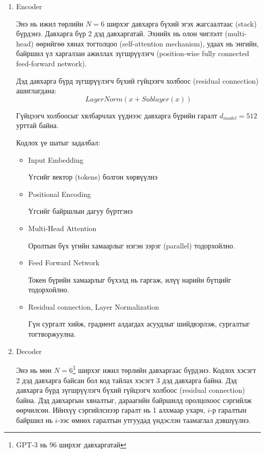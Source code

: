 \documentclass[11pt,a4paper]{article}
\begin{document}
\begin{enumerate}
\item Encoder
\label{sec:orgc57bc0b}

Энэ нь ижил төрлийн \(N=6\) ширхэг давхарга бүхий эгэх жагсаалтаас (stack) бүрдэнэ. Давхарга бүр 2 дэд давхаргатай. Эхнийх нь олон чиглэлт (multi-head) өөрийгөө хянах тогтолцоо (self-attention mechanism), удаах нь энгийн, байршил үл харгалзан ажиллах зүгшрүүлэгч (position-wise fully connected feed-forward network).\cite{Attention}

Дэд давхарга бүрд зүгшрүүлэгч бүхий гүйцээгч холбоос (residual connection) ашиглагдана: $$LayerNorm(x+Sublayer(x))$$

Гүйцээгч холбоосыг хялбарчлах үүднээс давхарга бүрийн гаралт \(d_{model}=512\) урттай байна.

Кодлох үе шатыг задалбал:

\begin{itemize}
\item Input Embedding

Үгсийг вектор (tokens) болгон хөрвүүлнэ

\item Positional Encoding

Үгсийг байршлын дагуу бүртгэнэ

\item Multi-Head Attention

Оролтын бүх үгийн хамаарлыг нэгэн зэрэг (parallel) тодорхойлно.

\item Feed Forward Network

Токен бүрийн хамаарлыг бүхэлд нь гаргаж, илүү нарийн бүтцийг тодорхойлно.

\item Residual connection, Layer Normalization

Гүн сургалт хийж, градиент алдагдах асуудлыг шийдвэрлэж, сургалтыг тогтворжуулна.
\end{itemize}
\item Decoder
\label{sec:orgc9978d5}

Энэ нь мөн \(N=6\)\footnote{GPT-3 нь 96 ширхэг давхаргатай} ширхэг ижил төрлийн давхаргаас бүрдэнэ. Кодлох хэсэгт 2 дэд давхарга байсан бол код тайлах хэсэгт 3 дэд давхарга байна. Дэд давхарга бүрд зүгшрүүлэгч бүхий гүйцээгч холбоос (residual connection) байна. Дэд давхаргын хяналтыг, дараагийн байршилд оролцохоос сэргийлж өөрчилсөн. Ийнхүү сэргийлснээр гаралт нь 1 алхмаар ухарч, $i$-р гаралтын байршил нь $i$-ээс өмнөх гаралтын утгуудад үндэслэн таамаглал дэвшүүлнэ. 


\end{enumerate}
\end{document}
